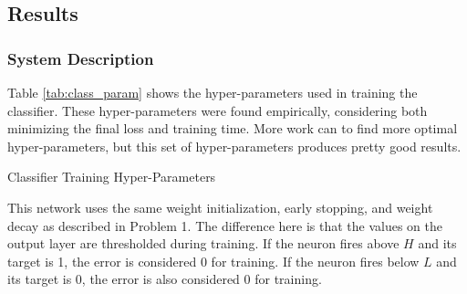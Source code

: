 \documentclass[a4paper, 12pt, titlepage]{article}
\newcommand{\tabRef}[1]{Table \ref{#1}}
\begin{document}
  \subsection{Results}
  \subsubsection{System Description}
  \par \tabRef{tab:class_param} shows the hyper-parameters used in training the
  classifier.
  These hyper-parameters were found empirically, considering both minimizing
  the final loss and training time.
  More work can to find more optimal hyper-parameters, but this set of
  hyper-parameters produces pretty good results.
  \begin{table}[htb]
    \centering
    \vspace{-12pt}
    \caption{Classifier Training Hyper-Parameters}
    \vspace{-12pt}
    \label{tab:class_param}
    \vspace{-12pt}
  \end{table}
  \par This network uses the same weight initialization, early stopping, and
  weight decay as described in Problem 1.
  The difference here is that the values on the output layer are thresholded
  during training.
  If the neuron fires above $H$ and its target is 1, the error is considered 0
  for training.
  If the neuron fires below $L$ and its target is 0, the error is also
  considered 0 for training.
\end{document}
